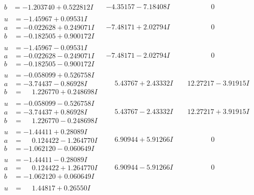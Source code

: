 \documentclass[1p]{elsarticle_modified}
\theoremstyle{definition}
\begin{document}
$$\begin{array}{c|c|c}
\begin{aligned}
b &= -1.203740 + 0.522812 I\end{aligned}
 & -4.35157 - 7.18408 I & \phantom{-0.000000 } 0 \\ \hline\begin{aligned}
u &= -1.45967 + 0.09531 I \\
a &= -0.022628 + 0.249071 I \\
b &= -0.182505 + 0.900172 I\end{aligned}
 & -7.48171 + 2.02794 I & \phantom{-0.000000 } 0 \\ \hline\begin{aligned}
u &= -1.45967 - 0.09531 I \\
a &= -0.022628 - 0.249071 I \\
b &= -0.182505 - 0.900172 I\end{aligned}
 & -7.48171 - 2.02794 I & \phantom{-0.000000 } 0 \\ \hline\begin{aligned}
u &= -0.058099 + 0.526758 I \\
a &= -3.74437 - 0.86928 I \\
b &= \phantom{-}1.226770 + 0.248698 I\end{aligned}
 & \phantom{-}5.43767 + 2.43332 I & \phantom{-}12.27217 - 3.91915 I \\ \hline\begin{aligned}
u &= -0.058099 - 0.526758 I \\
a &= -3.74437 + 0.86928 I \\
b &= \phantom{-}1.226770 - 0.248698 I\end{aligned}
 & \phantom{-}5.43767 - 2.43332 I & \phantom{-}12.27217 + 3.91915 I \\ \hline\begin{aligned}
u &= -1.44411 + 0.28089 I \\
a &= \phantom{-}0.124422 - 1.264770 I \\
b &= -1.062120 - 0.060649 I\end{aligned}
 & \phantom{-}6.90944 + 5.91266 I & \phantom{-0.000000 } 0 \\ \hline\begin{aligned}
u &= -1.44411 - 0.28089 I \\
a &= \phantom{-}0.124422 + 1.264770 I \\
b &= -1.062120 + 0.060649 I\end{aligned}
 & \phantom{-}6.90944 - 5.91266 I & \phantom{-0.000000 } 0 \\ \hline\begin{aligned}
u &= \phantom{-}1.44817 + 0.26550 I \\

\end{aligned}
\end{array}$$
\end{document}
